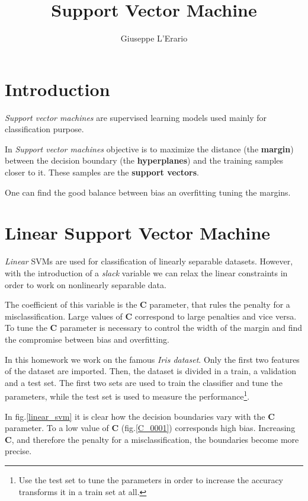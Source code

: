 \documentclass[10pt,a4paper]{article}
\author{Giuseppe L'Erario}
\date{}
\title{Support Vector Machine}
\begin{document}
\maketitle
\section*{Introduction}
\emph{Support vector machines} are supervised learning models used mainly for classification purpose.

In \emph{Support vector machines} objective is to maximize the distance (the \textbf{margin}) between the decision boundary (the \textbf{hyperplanes}) and the training samples closer to it. These samples are the \textbf{support vectors}.

One can find the good balance between bias an overfitting tuning the margins.


\section{Linear Support Vector Machine}
\emph{Linear} SVMs are used for classification of linearly separable datasets. However, with the introduction of a \emph{slack} variable we can relax the linear constraints in order to work on nonlinearly separable data.

The coefficient of this variable is the \textbf{C} parameter, that rules the penalty for a misclassification. Large values of \textbf{C} correspond to large penalties and vice versa. To tune the \textbf{C} parameter is necessary to control the  width of the margin and find the compromise between bias and overfitting.

In this homework we work on the famous \emph{Iris dataset}. Only the first two features of the dataset are imported. Then, the dataset is divided in a train, a validation and a test set. The first two sets are used to train the classifier and tune the parameters, while the test set is used to measure the performance\footnote{Use the test set to tune the parameters in order to increase the accuracy transforms it in a train set at all.}. 

In fig.\ref{linear_svm} it is clear how the decision boundaries vary with the \textbf{C} parameter. To a low value of \textbf{C} (fig.\ref{C_0001}) corresponds high bias. Increasing \textbf{C}, and therefore the penalty for a misclassification, the boundaries become more precise.
\end{document}
